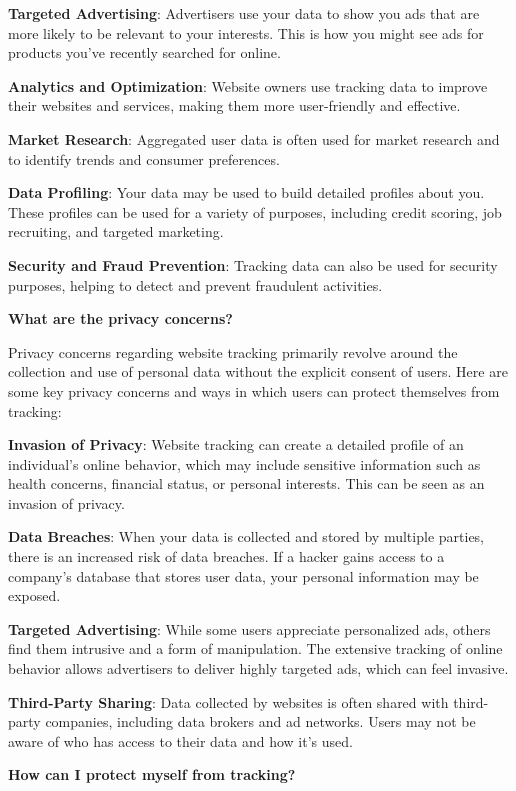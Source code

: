 \documentclass[
]{book}
\theoremstyle{definition}
\theoremstyle{definition}
\theoremstyle{definition}
\theoremstyle{definition}
\theoremstyle{remark}
\begin{document}
\textbf{Targeted Advertising}: Advertisers use your data to show you ads that are more likely to be relevant to your interests. This is how you might see ads for products you've recently searched for online.

\textbf{Analytics and Optimization}: Website owners use tracking data to improve their websites and services, making them more user-friendly and effective.

\textbf{Market Research}: Aggregated user data is often used for market research and to identify trends and consumer preferences.

\textbf{Data Profiling}: Your data may be used to build detailed profiles about you. These profiles can be used for a variety of purposes, including credit scoring, job recruiting, and targeted marketing.

\textbf{Security and Fraud Prevention}: Tracking data can also be used for security purposes, helping to detect and prevent fraudulent activities.

\textbf{What are the privacy concerns?}

Privacy concerns regarding website tracking primarily revolve around the collection and use of personal data without the explicit consent of users. Here are some key privacy concerns and ways in which users can protect themselves from tracking:

\textbf{Invasion of Privacy}: Website tracking can create a detailed profile of an individual's online behavior, which may include sensitive information such as health concerns, financial status, or personal interests. This can be seen as an invasion of privacy.

\textbf{Data Breaches}: When your data is collected and stored by multiple parties, there is an increased risk of data breaches. If a hacker gains access to a company's database that stores user data, your personal information may be exposed.

\textbf{Targeted Advertising}: While some users appreciate personalized ads, others find them intrusive and a form of manipulation. The extensive tracking of online behavior allows advertisers to deliver highly targeted ads, which can feel invasive.

\textbf{Third-Party Sharing}: Data collected by websites is often shared with third-party companies, including data brokers and ad networks. Users may not be aware of who has access to their data and how it's used.

\textbf{How can I protect myself from tracking?}
\end{document}

